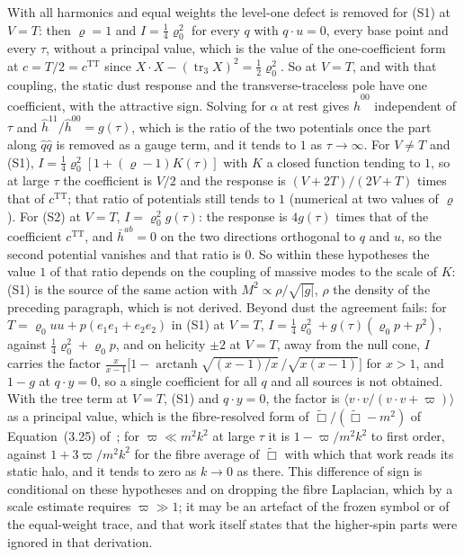 With all harmonics and equal weights the level-one defect is removed for (S1) at \(V=T\): then \(\varrho=1\) and \(I=\tfrac14\varrho_0^2\) for every \(q\) with \(q\cdot u=0\), every base point and every \(\tau\), without a principal value, which is the value of the one-coefficient form at \(c=T/2=c^{\mathrm{TT}}\) since \(X\cdot X-(\operatorname{tr}_3X)^2=\tfrac12\varrho_0^2\). So at \(V=T\), and with that coupling, the static dust response and the transverse-traceless pole have one coefficient, with the attractive sign. Solving for \(\alpha\) at rest gives \(\hat h^{00}\) independent of \(\tau\) and \(\hat h^{11}/\hat h^{00}=g(\tau)\), which is the ratio of the two potentials once the part along \(\hat q\hat q\) is removed as a gauge term, and it tends to \(1\) as \(\tau\to\infty\). For \(V\neq T\) and (S1), \(I=\tfrac14\varrho_0^2[1+(\varrho-1)K(\tau)]\) with \(K\) a closed function tending to \(1\), so at large \(\tau\) the coefficient is \(V/2\) and the response is \((V+2T)/(2V+T)\) times that of \(c^{\mathrm{TT}}\); that ratio of potentials still tends to \(1\) (numerical at two values of \(\varrho\)). For (S2) at \(V=T\), \(I=\varrho_0^2g(\tau)\): the response is \(4g(\tau)\) times that of the coefficient \(c^{\mathrm{TT}}\), and \(\bar h^{ab}=0\) on the two directions orthogonal to \(q\) and \(u\), so the second potential vanishes and that ratio is \(0\). So within these hypotheses the value \(1\) of that ratio depends on the coupling of massive modes to the scale of \(K\): (S1) is the source of the same action with \(M^2\propto\rho/\sqrt{|g|}\), \(\rho\) the density of the preceding paragraph, which is not derived. Beyond dust the agreement fails: for \(T=\varrho_0uu+p(e_1e_1+e_2e_2)\) in (S1) at \(V=T\), \(I=\tfrac14\varrho_0^2+g(\tau)(\varrho_0p+p^2)\), against \(\tfrac14\varrho_0^2+\varrho_0p\), and on helicity \(\pm2\) at \(V=T\), away from the null cone, \(I\) carries the factor \(\tfrac{x}{x-1}\bigl[1-\operatorname{arctanh}\sqrt{(x-1)/x}\,/\sqrt{x(x-1)}\bigr]\) for \(x>1\), and \(1-g\) at \(q\cdot y=0\), so a single coefficient for all \(q\) and all sources is not obtained. With the tree term at \(V=T\), (S1) and \(q\cdot y=0\), the factor is \(\langle v\cdot v/(v\cdot v+\varpi)\rangle\) as a principal value, which is the fibre-resolved form of \(\tilde\Box/(\tilde\Box-m^2)\) of Equation~(3.25) of~\cite{Steinacker2026}; for \(\varpi\ll m^2k^2\) at large \(\tau\) it is \(1-\varpi/m^2k^2\) to first order, against \(1+3\varpi/m^2k^2\) for the fibre average of \(\tilde\Box\) with which that work reads its static halo, and it tends to zero as \(k\to0\) as there. This difference of sign is conditional on these hypotheses and on dropping the fibre Laplacian, which by a scale estimate requires \(\varpi\gg1\); it may be an artefact of the frozen symbol or of the equal-weight trace, and that work itself states that the higher-spin parts were ignored in that derivation.

